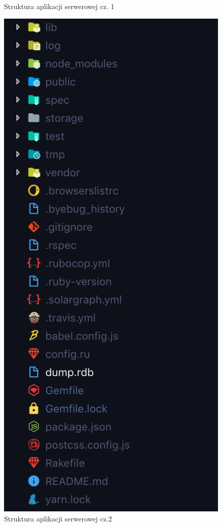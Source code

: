 \documentclass[declaration,shortabstract]{iithesis}
\begin{document}
\begin{figure}
\begin{minipage}[b]{0.4\textwidth}
        \caption{Struktura aplikacji serwerowej cz. 1}
        \label{fig:struktura_serwer1}
    \end{minipage}
    \hfill
    \begin{minipage}[b]{0.4\textwidth}
        \includegraphics[width=\textwidth]{images/serwer2.png}
        \caption{Struktura aplikacji serwerowej cz.2}
        \label{fig:struktura_serwer2}
    \end{minipage}
\end{figure}
\end{document}
